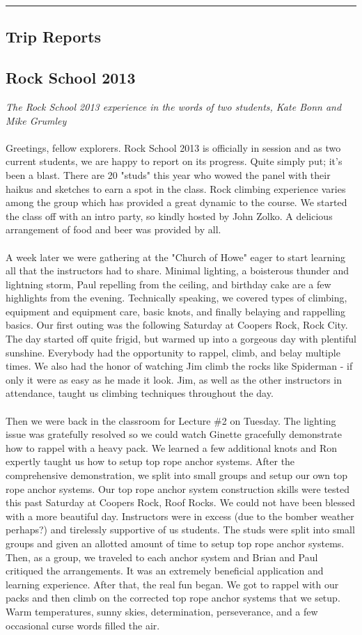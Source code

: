 \documentclass[10pt,a4paper]{article}
\newcommand{\SepRule}{\noindent							 %
						\begin{center}
							\rule{250pt}{1pt}
						\end{center}
						}
\newcommand\sect[1]{%
  \section*{#1}%
  \addcontentsline{toc}{section}{#1}}
\newcommand\subsect[1]{%
  \subsection*{#1}%
  \addcontentsline{toc}{subsection}{#1}}
\begin{document}
\vspace{0.5cm}
	\SepRule
\vspace{0.5cm}
\begin{multicols}{2}


\sect{Trip Reports}

\subsect{Rock School 2013}
\textit{The Rock School 2013 experience in the words of two students, Kate Bonn and Mike Grumley}
\\
\\
Greetings, fellow explorers. Rock School 2013 is officially in session and as two current students, we are happy to report on its progress. Quite simply put; it's been a blast. There are 20 "studs" this year who wowed the panel with their haikus and sketches to earn a spot in the class. Rock climbing experience varies among the group which has provided a great dynamic to the course. We started the class off with an intro party, so kindly hosted by John Zolko. A delicious arrangement of food and beer was provided by all. 
\\
\\
A week later we were gathering at the "Church of Howe" eager to start learning all that the instructors had to share. Minimal lighting, a boisterous thunder and lightning storm, Paul repelling from the ceiling, and birthday cake are a few highlights from the evening. Technically speaking, we covered types of climbing, equipment and equipment care, basic knots, and finally belaying and rappelling basics. Our first outing was the following Saturday at Coopers Rock, Rock City. The day started off quite frigid, but warmed up into a gorgeous day with plentiful sunshine. Everybody had the opportunity to rappel, climb, and belay multiple times. We also had the honor of watching Jim climb the rocks like Spiderman - if only it were as easy as he made it look. Jim, as well as the other instructors in attendance, taught us climbing techniques throughout the day. 
\\
\\
Then we were back in the classroom for Lecture \#2 on Tuesday. The lighting issue was gratefully resolved so we could watch Ginette gracefully demonstrate how to rappel with a heavy pack. We learned a few additional knots and Ron expertly taught us how to setup top rope anchor systems. After the comprehensive demonstration, we split into small groups and setup our own top rope anchor systems. Our top rope anchor system construction skills were tested this past Saturday at Coopers Rock, Roof Rocks. We could not have been blessed with a more beautiful day. Instructors were in excess (due to the bomber weather perhaps?) and tirelessly supportive of us students. The studs were split into small groups and given an allotted amount of time to setup top rope anchor systems. Then, as a group, we traveled to each anchor system and Brian and Paul critiqued the arrangements. It was an extremely beneficial application and learning experience. After that, the real fun began. We got to rappel with our packs and then climb on the corrected top rope anchor systems that we setup. Warm temperatures, sunny skies, determination, perseverance, and a few occasional curse words filled the air.


\end{multicols}
\end{document}
